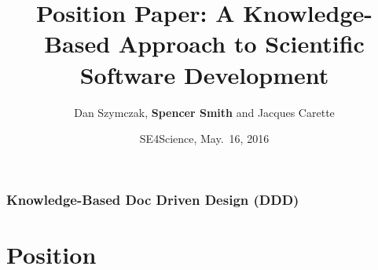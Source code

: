 \documentclass{beamer}
\title[\pgfuseimage{logo}] %
{Position Paper: A Knowledge-Based Approach to Scientific Software Development}
\author[Slide \thepage~of \pageref{TotPages}] %
{Dan Szymczak, \textbf{Spencer Smith} and Jacques Carette}
\institute[McMaster University] %
{
  Computing and Software Department\\
  Faculty of Engineering\\
  McMaster University
}
\date[Jan 12, 2016] %
{SE4Science, May.\ 16, 2016}
\begin{document}
\begin{frame}

\titlepage

\end{frame}


\begin{frame}

\frametitle{Knowledge-Based Doc Driven Design (DDD)}
\tableofcontents


\end{frame}


\section[Position]{Position}


\end{document}
